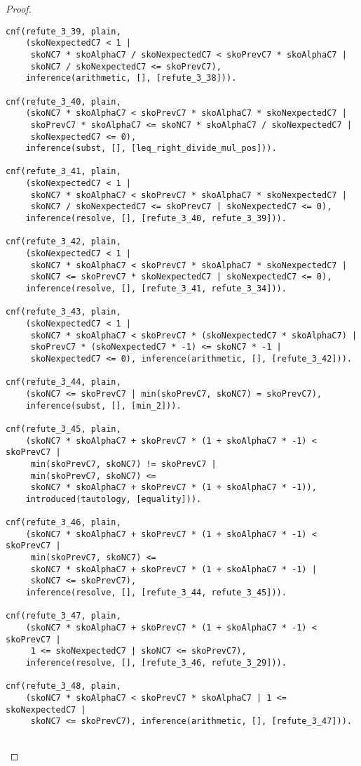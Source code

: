 \begin{proof}
\begin{verbatim}
cnf(refute_3_39, plain,
    (skoNexpectedC7 < 1 |
     skoNC7 * skoAlphaC7 / skoNexpectedC7 < skoPrevC7 * skoAlphaC7 |
     skoNC7 / skoNexpectedC7 <= skoPrevC7),
    inference(arithmetic, [], [refute_3_38])).

cnf(refute_3_40, plain,
    (skoNC7 * skoAlphaC7 < skoPrevC7 * skoAlphaC7 * skoNexpectedC7 |
     skoPrevC7 * skoAlphaC7 <= skoNC7 * skoAlphaC7 / skoNexpectedC7 |
     skoNexpectedC7 <= 0),
    inference(subst, [], [leq_right_divide_mul_pos])).

cnf(refute_3_41, plain,
    (skoNexpectedC7 < 1 |
     skoNC7 * skoAlphaC7 < skoPrevC7 * skoAlphaC7 * skoNexpectedC7 |
     skoNC7 / skoNexpectedC7 <= skoPrevC7 | skoNexpectedC7 <= 0),
    inference(resolve, [], [refute_3_40, refute_3_39])).

cnf(refute_3_42, plain,
    (skoNexpectedC7 < 1 |
     skoNC7 * skoAlphaC7 < skoPrevC7 * skoAlphaC7 * skoNexpectedC7 |
     skoNC7 <= skoPrevC7 * skoNexpectedC7 | skoNexpectedC7 <= 0),
    inference(resolve, [], [refute_3_41, refute_3_34])).

cnf(refute_3_43, plain,
    (skoNexpectedC7 < 1 |
     skoNC7 * skoAlphaC7 < skoPrevC7 * (skoNexpectedC7 * skoAlphaC7) |
     skoPrevC7 * (skoNexpectedC7 * -1) <= skoNC7 * -1 |
     skoNexpectedC7 <= 0), inference(arithmetic, [], [refute_3_42])).

cnf(refute_3_44, plain,
    (skoNC7 <= skoPrevC7 | min(skoPrevC7, skoNC7) = skoPrevC7),
    inference(subst, [], [min_2])).

cnf(refute_3_45, plain,
    (skoNC7 * skoAlphaC7 + skoPrevC7 * (1 + skoAlphaC7 * -1) < skoPrevC7 |
     min(skoPrevC7, skoNC7) != skoPrevC7 |
     min(skoPrevC7, skoNC7) <=
     skoNC7 * skoAlphaC7 + skoPrevC7 * (1 + skoAlphaC7 * -1)),
    introduced(tautology, [equality])).

cnf(refute_3_46, plain,
    (skoNC7 * skoAlphaC7 + skoPrevC7 * (1 + skoAlphaC7 * -1) < skoPrevC7 |
     min(skoPrevC7, skoNC7) <=
     skoNC7 * skoAlphaC7 + skoPrevC7 * (1 + skoAlphaC7 * -1) |
     skoNC7 <= skoPrevC7),
    inference(resolve, [], [refute_3_44, refute_3_45])).

cnf(refute_3_47, plain,
    (skoNC7 * skoAlphaC7 + skoPrevC7 * (1 + skoAlphaC7 * -1) < skoPrevC7 |
     1 <= skoNexpectedC7 | skoNC7 <= skoPrevC7),
    inference(resolve, [], [refute_3_46, refute_3_29])).

cnf(refute_3_48, plain,
    (skoNC7 * skoAlphaC7 < skoPrevC7 * skoAlphaC7 | 1 <= skoNexpectedC7 |
     skoNC7 <= skoPrevC7), inference(arithmetic, [], [refute_3_47])).


\end{verbatim}
\end{proof}
